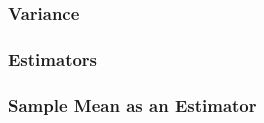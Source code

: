 \documentclass[handout]{beamer}
\newcommand{\blue}[1]{\textcolor{blue2}{#1}}
\newcommand{\xbar}{\overline{x}}
\newcommand{\E}{\mathbb{E}}
\newcommand{\Var}{\mbox{Var}}
\begin{document}
\begin{frame}
\frametitle{Variance}
%
%
%
%
%

\end{frame}


\begin{frame}
\frametitle{Estimators}

%
%
%
%

\end{frame}


\begin{frame}
\frametitle{Sample Mean as an Estimator}

%
%
%
%
%
%

\end{frame}
\end{document}
